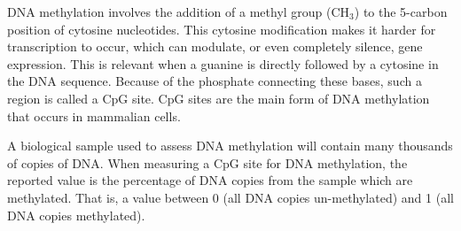 \documentclass{article}
\begin{document}
DNA methylation involves the addition of a methyl group (CH\(_3\)) to the 5-carbon position of cytosine nucleotides. This cytosine modification makes it harder for transcription to occur, which can modulate, or even completely silence, gene expression. This is relevant when a guanine is directly followed by a cytosine in the DNA sequence. Because of the phosphate connecting these bases, such a region is called a CpG site. CpG sites are the main form of DNA methylation that occurs in mammalian cells. 

A biological sample used to assess DNA methylation will contain many thousands of copies of DNA. When measuring a CpG site for DNA methylation, the reported value is the percentage of DNA copies from the sample which are methylated. That is, a value between 0 (all DNA copies un-methylated) and 1 (all DNA copies methylated).

\end{document}
